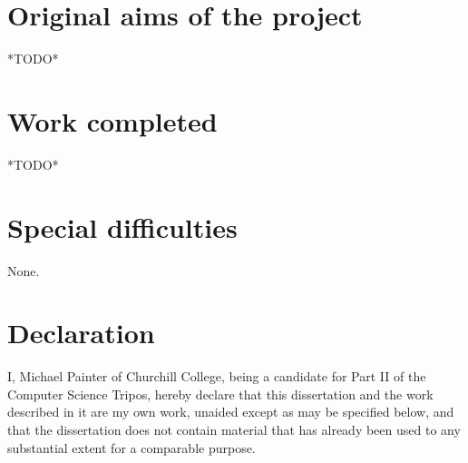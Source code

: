\documentclass[12pt,twoside,notitlepage]{report}
\begin{document}


\section*{Original aims of the project}
    *TODO*

\section*{Work completed}
    *TODO*

\section*{Special difficulties}
    None.
 
\newpage
\section*{Declaration}

I, Michael Painter of Churchill College, being a candidate for Part II of the Computer Science Tripos, hereby declare 
that this dissertation and the work described in it are my own work, unaided except as may be specified below, and that 
the dissertation does not contain material that has already been used to any substantial extent for a comparable 
purpose.

\bigskip
\bigskip
\bigskip
\bigskip

\leftline{\rule{6cm}{0.5pt}}

\bigskip
\bigskip
\bigskip
\bigskip

\leftline{\rule{4cm}{0.5pt}}











\cleardoublepage
\setcounter{tocdepth}{1}
\tableofcontents










\end{document}
